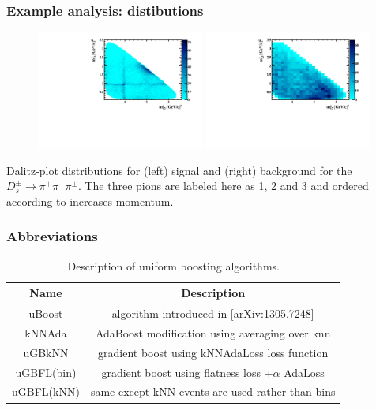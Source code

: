 \documentclass{beamer}
\begin{document}
\begin{frame}[t]
    \frametitle{Example analysis: distibutions}

    \begin{figure}[] 
          \centering 
          \includegraphics[width=0.49\textwidth]{../paperdraft/graphs2/DP_sig.pdf}
          \includegraphics[width=0.49\textwidth]{../paperdraft/graphs2/DP_bkgd.pdf}
    \end{figure}
    Dalitz-plot distributions for (left) signal and (right) background for the $D_s^\pm\to\pi^+\pi^-\pi^\pm$.  The three pions are labeled here as 1, 2 and 3 and ordered according to increases momentum.
\end{frame}

\begin{frame}[t]\frametitle{Abbreviations}
    \begin{table}
      \begin{center}
        \caption{\label{tab:algs} Description of uniform boosting algorithms.}
        \begin{tabular}{c|c}
          \hline
          Name & Description \\
          \hline
            uBoost & algorithm introduced in [arXiv:1305.7248]\\
          \hline
            kNNAda & AdaBoost modification using averaging over knn \\
            uGBkNN & gradient boost using kNNAdaLoss loss function \\
            uGBFL(bin) & gradient boost using flatness loss $+ \alpha$ AdaLoss  \\
            uGBFL(kNN) & same except kNN events are used rather than bins \\
          \hline
        \end{tabular}
      \end{center}
    \end{table}

\end{frame}
\end{document}
